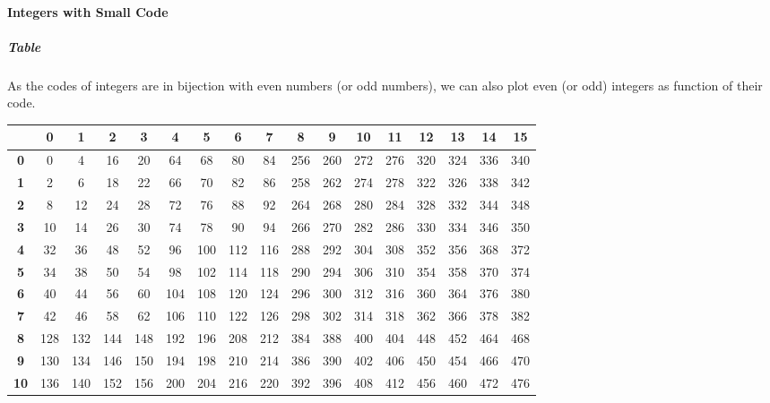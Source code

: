 \paragraph{Integers with Small Code}
\subparagraph{Table}
\label{table:CodeToIntegers}
As the codes of integers are in bijection with even numbers (or odd numbers), we can also plot even (or odd) integers as function of their code.
\begin{center}
	\begin{tabular}{|c||c|c|c|c|c|c|c|c|c|c|c|c|c|c|c|c|}
		\hline
		\textbf{} & \textbf{0} & \textbf{1} & \textbf{2} & \textbf{3} & \textbf{4} & \textbf{5} & \textbf{6} & \textbf{7} & \textbf{8} & \textbf{9} & \textbf{10} & \textbf{11} & \textbf{12} & \textbf{13} & \textbf{14} & \textbf{15} \\
		\hline\hline
		\textbf{0} & 0 & 4 & 16 & 20 & 64 & 68 & 80 & 84 & 256 & 260 & 272 & 276 & 320 & 324 & 336 & 340 \\
		\textbf{1} & 2 & 6 & 18 & 22 & 66 & 70 & 82 & 86 & 258 & 262 & 274 & 278 & 322 & 326 & 338 & 342 \\
		\textbf{2} & 8 & 12 & 24 & 28 & 72 & 76 & 88 & 92 & 264 & 268 & 280 & 284 & 328 & 332 & 344 & 348 \\
		\textbf{3} & 10 & 14 & 26 & 30 & 74 & 78 & 90 & 94 & 266 & 270 & 282 & 286 & 330 & 334 & 346 & 350 \\
		\textbf{4} & 32 & 36 & 48 & 52 & 96 & 100 & 112 & 116 & 288 & 292 & 304 & 308 & 352 & 356 & 368 & 372 \\
		\textbf{5} & 34 & 38 & 50 & 54 & 98 & 102 & 114 & 118 & 290 & 294 & 306 & 310 & 354 & 358 & 370 & 374 \\
		\textbf{6} & 40 & 44 & 56 & 60 & 104 & 108 & 120 & 124 & 296 & 300 & 312 & 316 & 360 & 364 & 376 & 380 \\
		\textbf{7} & 42 & 46 & 58 & 62 & 106 & 110 & 122 & 126 & 298 & 302 & 314 & 318 & 362 & 366 & 378 & 382 \\
		\textbf{8} & 128 & 132 & 144 & 148 & 192 & 196 & 208 & 212 & 384 & 388 & 400 & 404 & 448 & 452 & 464 & 468 \\
		\textbf{9} & 130 & 134 & 146 & 150 & 194 & 198 & 210 & 214 & 386 & 390 & 402 & 406 & 450 & 454 & 466 & 470 \\
		\textbf{10} & 136 & 140 & 152 & 156 & 200 & 204 & 216 & 220 & 392 & 396 & 408 & 412 & 456 & 460 & 472 & 476 \\
		\hline
	\end{tabular}
\end{center}
